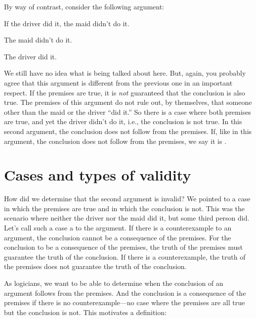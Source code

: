 By way of contrast, consider the following argument:
\begin{earg}\label{argMaidDriver}
	\item[] If the driver did it, the maid didn't do it.
	\item[] The maid didn't do it.
	\item[\texttherefore] The driver did it.
\end{earg}
We still have no idea what is being talked about here. But, again, you probably agree that this argument is different from the previous one in an important respect. If the premises are true, it is \emph{not} guaranteed that the conclusion is also true. The premises of this argument do not rule out, by themselves, that someone other than the maid or the driver ``did it.'' So there is a case where both premises are true, and yet the driver didn't do it, i.e., the conclusion is not true. In this second argument, the conclusion does not follow from the premises. If, like in this argument, the conclusion does not follow from the premises, we say it is .

\section{Cases and types of validity}

How did we determine that the second argument is invalid? We pointed to a case in which the premises are true and in which the conclusion is not.  This was the scenario where neither the driver nor the maid did it, but some third person did.  Let's call such a case a  to the argument. If there is a counterexample to an argument, the conclusion cannot be a consequence of the premises. For the conclusion to be a consequence of the premises, the truth of the premises must guarantee the truth of the conclusion. If there is a counterexample, the truth of the premises does not guarantee the truth of the conclusion.

As logicians, we want to be able to determine when the conclusion of an argument follows from the premises. And the conclusion is a consequence of the premises if there is no counterexample---no case where the premises are all true but the conclusion is not. This motivates a definition:


